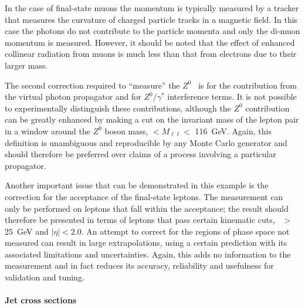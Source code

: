In the case of final-state muons the momentum is typically measured by a
tracker that measures the curvature of charged particle tracks in a magnetic
field. In this case the photons do not contribute to the particle
momenta and only the di-muon momentum is measured.
However, it should be noted that the effect of enhanced collinear radiation from muons is much less than that from electrons due to their larger mass.

The second correction required to ``measure'' the $Z^0$ \pt\ is for the
contribution from the virtual photon propagator and for $Z^0/\gamma^*$
interference terms. It is not possible to experimentally distinguish
these contributions, although the $Z^0$ contribution can be greatly
enhanced by making a cut on the invariant mass of the lepton pair in a
window around the $Z^0$ boson mass,  $< M_{\ell\ell} <$
116~GeV. Again, this definition is unambiguous and reproducible by any
Monte Carlo generator and should therefore be preferred over claims of a process
involving a particular propagator.

Another important issue that can be demonstrated in this example is the
correction for the acceptance of the final-state leptons.  The
measurement can only be performed on leptons that fall within the
acceptance; the result should therefore be presented in terms of leptons
that pass certain kinematic cuts, \eg \pt\ $>$ 25~GeV and $|\eta| <
2.0$. An attempt to correct for the regions of phase space not measured
can result in large extrapolations, using a certain prediction with
its associated limitations and uncertainties. Again, this adds no
information to the measurement and in fact reduces its
accuracy, reliability and usefulness for validation and tuning.


\paragraph{Jet cross sections}

